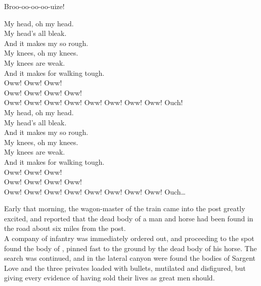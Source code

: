 Broo-oo-oo-oo-uize! \\




My head, oh my head. \\
My head's all bleak. \\
And it makes my  so rough. \\

My knees, oh my knees. \\
My knees are weak. \\
And it makes for walking tough. \\

Oww! Oww! Oww! \\
Oww! Oww! Oww! Oww! \\
Oww! Oww! Oww! Oww! Oww! Oww! Oww! Oww! Ouch! \\

My head, oh my head. \\
My head's all bleak. \\
And it makes my  so rough. \\

My knees, oh my knees. \\
My knees are weak. \\
And it makes for walking tough. \\

Oww! Oww! Oww! \\
Oww! Oww! Oww! Oww! \\
Oww! Oww! Oww! Oww! Oww! Oww! Oww! Oww! Ouch… \\





Early that morning, the wagon-master of the train came into the post greatly excited, and reported that the dead body of a man and horse had been found in the road about six miles from the post. \\

A company of infantry was immediately ordered out, and proceeding to the spot found the body of , pinned fast to the ground by the dead body of his horse. The search was continued, and in the lateral canyon were found the bodies of Sargent Love and the three privates loaded with bullets, mutilated and disfigured, but giving every evidence of having sold their lives as great men should. \\

